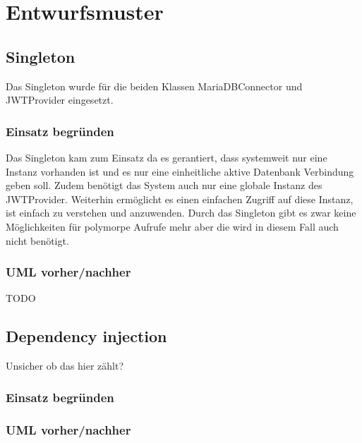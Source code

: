 \chapter{Entwurfsmuster}


\section{Singleton}

Das Singleton wurde für die beiden Klassen MariaDBConnector und JWTProvider eingesetzt.

\subsection{Einsatz begründen}

Das Singleton kam zum Einsatz da es gerantiert,
dass systemweit nur eine Instanz vorhanden ist und es nur eine einheitliche aktive Datenbank Verbindung geben soll.
Zudem benötigt das System auch nur eine globale Instanz des JWTProvider.
Weiterhin ermöglicht es einen einfachen Zugriff auf diese Instanz, ist einfach zu verstehen und anzuwenden.
Durch das Singleton gibt es zwar keine Möglichkeiten für polymorpe Aufrufe mehr aber die wird in diesem Fall auch nicht benötigt.


\subsection{UML vorher/nachher}
TODO

\section{Dependency injection}
Unsicher ob das hier zählt?
\subsection{Einsatz begründen}
\subsection{UML vorher/nachher}
